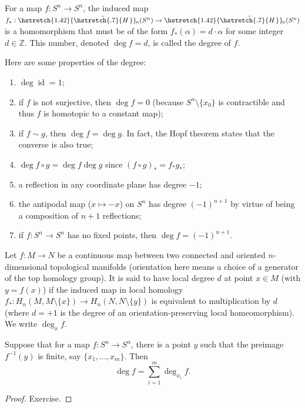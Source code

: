 \documentclass[english,letterpaper]{article}%
\numberwithin{equation}{section}
\numberwithin{figure}{section}
\numberwithin{table}{section}
\theoremstyle{definition}
\theoremstyle{definition}
\theoremstyle{definition}
\theoremstyle{plain}
\theoremstyle{plain}
\theoremstyle{plain}
\theoremstyle{plain}
\theoremstyle{remark}
\theoremstyle{remark}
\newcommand{\bbZ}{\mathbb{Z}}
\DeclareMathOperator{\id}{id}
\newcommand\wt[1]{\hstretch{1.42}{\tilde{\hstretch{.7}{#1\mkern2mu}}}\mkern-2mu}
\begin{document}
\begin{defn}\label{Degree}
    For a map $f:S^n\to S^n$, the induced map $f_\ast:\wt{H}_n(S^n)\to \wt{H}_n(S^n)$ is a homomorphism that must be of the form $f_\ast(\alpha)=d\cdot \alpha$ for some integer $d\in\bbZ$. This number, denoted $\deg f=d$, is called the degree of $f$.
\end{defn}
Here are some properties of the degree:
\begin{enumerate}
    \item $\deg\id=1$;
    \item if $f$ is not surjective, then $\deg f=0$ (because $S^n\setminus\{x_0\}$ is contractible and thus $f$ is homotopic to a constant map);
    \item if $f\sim g$, then $\deg f=\deg g$. In fact, the Hopf theorem states that the converse is also true;
    \item $\deg f\circ g=\deg f\deg g$ since $(f\circ g)_\ast=f_\ast g_\ast $;
    \item a reflection in any coordinate plane has degree $-1$;
    \item the antipodal map ($x\mapsto -x$) on $S^n$ has degree $(-1)^{n+1}$ by virtue of being a composition of $n+1$ reflections;
    \item if $f:S^n\to S^n$ has no fixed points, then $\deg f=(-1)^{n+1}$.
\end{enumerate}


\begin{defn}
    Let $f:M\to N$ be a continuous map between two connected and oriented $n$-dimensional topological manifolds (orientation here means a choice of a generator of the top homology group). It is said to have local degree $d$ at point $x\in M$ (with $y=f(x)$) if the induced map in local homology $f_\ast:H_n(M,M\setminus\{x\})\to H_n(N,N\setminus\{y\})$ is equivalent to multiplication by $d$ (where $d=+1$ is the degree of an orientation-preserving local homeomorphism). We write $\deg_x f$.
\end{defn}

\begin{prop}
    Suppose that for a map $f:S^n\to S^n$, there is a point $y$ such that the preimage $f^{-1}(y)$ is finite, say $\{x_1,\ldots,x_m\}$. Then \[\deg f=\sum_{i=1}^m \deg_{x_i} f.\]
\end{prop}
\begin{proof}
     Exercise.
\end{proof}
\end{document}
